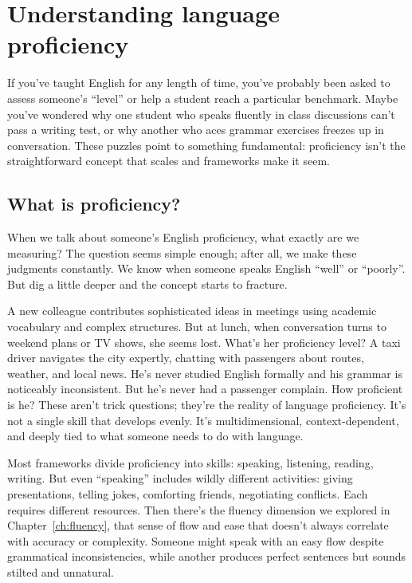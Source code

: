 \appendix \label{ch:appendix}

\chapter{Understanding language proficiency}
\label{ch:proficiency}

If you've taught English for any length of time, you've probably been asked to assess someone's \enquote{level} or help a student reach a particular benchmark. Maybe you've wondered why one student who speaks fluently in class discussions can't pass a writing test, or why another who aces grammar exercises freezes up in conversation. These puzzles point to something fundamental: proficiency isn't the straightforward concept that scales and frameworks make it seem.

\section{What is proficiency?}

When we talk about someone's English proficiency, what exactly are we measuring? The question seems simple enough; after all, we make these judgments constantly. We know when someone speaks English \enquote{well} or \enquote{poorly}. But dig a little deeper and the concept starts to fracture.

\ea A new colleague contributes sophisticated ideas in meetings using academic vocabulary and complex structures. But at lunch, when conversation turns to weekend plans or TV shows, she seems lost. What's her proficiency level?
\ex A taxi driver navigates the city expertly, chatting with passengers about routes, weather, and local news. He's never studied English formally and his grammar is noticeably inconsistent. But he's never had a passenger complain. How proficient is he?
\z
These aren't trick questions; they're the reality of language proficiency. It's not a single skill that develops evenly. It's multidimensional, context-dependent, and deeply tied to what someone needs to do with language.

Most frameworks divide proficiency into skills: speaking, listening, reading, writing. But even \enquote{speaking} includes wildly different activities: giving presentations, telling jokes, comforting friends, negotiating conflicts. Each requires different resources. Then there's the fluency dimension we explored in Chapter~\ref{ch:fluency}, that sense of flow and ease that doesn't always correlate with accuracy or complexity. Someone might speak with an easy flow despite grammatical inconsistencies, while another produces perfect sentences but sounds stilted and unnatural.

